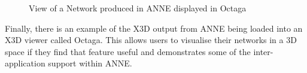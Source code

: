 \documentclass{acm_proc_article-sp}
\begin{document}
{\begin{figure}[t]
\centering
{}
\caption{View of a Network produced in ANNE displayed in Octaga}
\label{fig:persistence:octaga}
\end{figure}
Finally, there is an example of the X3D output from ANNE being loaded into an X3D viewer called Octaga\cite{octaga}. This allows users to visualise their networks in a 3D space if they find that feature useful and demonstrates some of the  inter{}-application support within ANNE.
}
\end{document}

